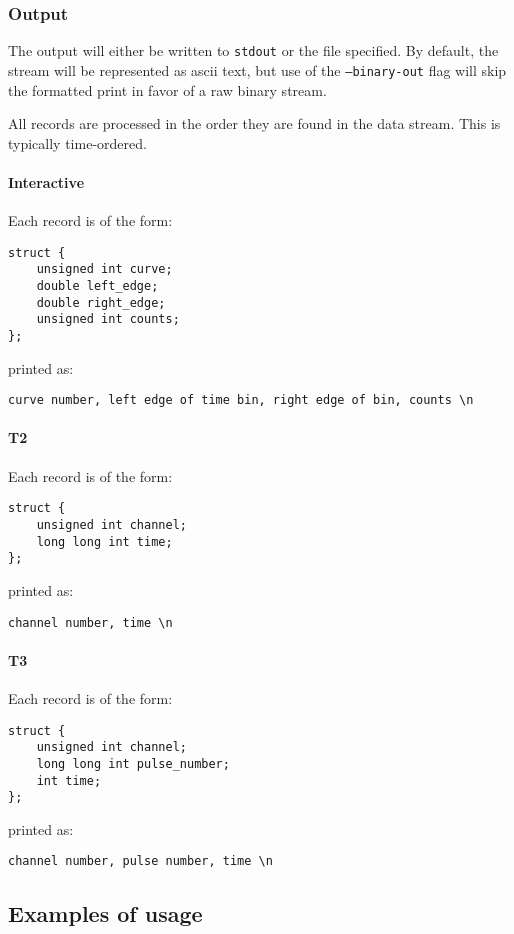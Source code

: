 \documentclass{article}
\newcommand{\stdout}{\texttt{stdout}}
\begin{document}
\subsubsection{Output}
\label{sec:picoquant_output}
The output will either be written to \stdout{} or the file specified. By default, the stream will be represented as ascii text, but use of the \texttt{--binary-out} flag will skip the formatted print in favor of a raw binary stream. 

All records are processed in the order they are found in the data stream. This is typically time-ordered.

\paragraph{Interactive}
Each record is of the form:
\begin{verbatim}
struct {
    unsigned int curve;
    double left_edge;
    double right_edge;
    unsigned int counts;
};
\end{verbatim}
printed as:
\begin{verbatim}
curve number, left edge of time bin, right edge of bin, counts \n
\end{verbatim}

\paragraph{T2}
Each record is of the form:
\begin{verbatim}
struct {
    unsigned int channel;
    long long int time;
};
\end{verbatim}
printed as:
\begin{verbatim}
channel number, time \n
\end{verbatim}

\paragraph{T3}
Each record is of the form:
\begin{verbatim}
struct {
	unsigned int channel;
	long long int pulse_number;
	int time;
};
\end{verbatim}
printed as:
\begin{verbatim}
channel number, pulse number, time \n
\end{verbatim}
	
\subsection{Examples of usage}
\end{document}
